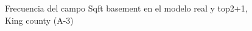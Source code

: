 \begin{figure}[H]
    \centering
    
    \caption{Frecuencia del campo Sqft basement en el modelo real y top2+1, King county (A-3)}
    \label{frecuency-top2+1-sqft basement}
\end{figure}